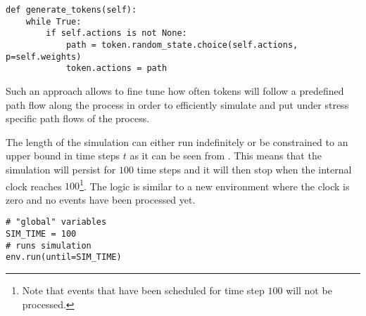 \begin{lstlisting}[caption=Start event token generation method in which an action is being sampled from the action pool by accounting for its weighted probability.,label=lst:path_tokens_assignment,style=CustomPython]
def generate_tokens(self):
    while True:
        if self.actions is not None:
            path = token.random_state.choice(self.actions, p=self.weights)
            token.actions = path
\end{lstlisting}

Such an approach allows to fine tune how often tokens will follow a predefined path flow along the process in order to efficiently simulate and put under stress specific path flows of the process.

The length of the simulation can either run indefinitely or be constrained to an upper bound in time steps $t$ as it can be seen from . This means that the simulation will persist for $100$ time steps and it will then stop when the internal clock reaches $100$\footnote{Note that events that have been scheduled for time step $100$ will not be processed.}. The logic is similar to a new environment where the clock is zero and no events have been processed yet.

\begin{lstlisting}[caption=Discrete event simulation environment start by calling its corresponding run method with a discrete simulation time step $t$ set. In this case the simulation will run for $100$ time steps.,label=lst:simulation_steps,style=CustomPython]
# "global" variables
SIM_TIME = 100
# runs simulation
env.run(until=SIM_TIME)
\end{lstlisting}

